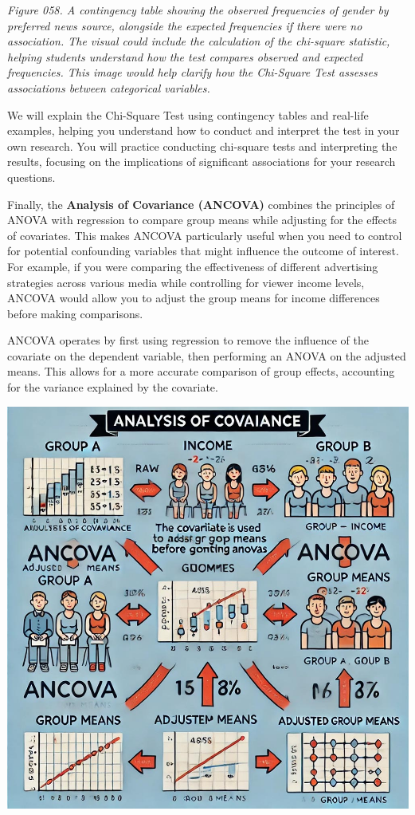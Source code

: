 \documentclass[
]{book}
\begin{document}
\emph{Figure 058. A contingency table showing the observed frequencies of gender by preferred news source, alongside the expected frequencies if there were no association. The visual could include the calculation of the chi-square statistic, helping students understand how the test compares observed and expected frequencies. This image would help clarify how the Chi-Square Test assesses associations between categorical variables.}

We will explain the Chi-Square Test using contingency tables and real-life examples, helping you understand how to conduct and interpret the test in your own research. You will practice conducting chi-square tests and interpreting the results, focusing on the implications of significant associations for your research questions.

Finally, the \textbf{Analysis of Covariance (ANCOVA)} combines the principles of ANOVA with regression to compare group means while adjusting for the effects of covariates. This makes ANCOVA particularly useful when you need to control for potential confounding variables that might influence the outcome of interest. For example, if you were comparing the effectiveness of different advertising strategies across various media while controlling for viewer income levels, ANCOVA would allow you to adjust the group means for income differences before making comparisons.

ANCOVA operates by first using regression to remove the influence of the covariate on the dependent variable, then performing an ANOVA on the adjusted means. This allows for a more accurate comparison of group effects, accounting for the variance explained by the covariate.

\includegraphics[width=1\textwidth,height=\textheight]{images/fig059.jpg}
\end{document}
